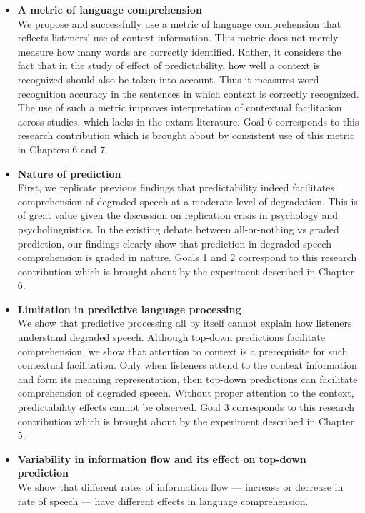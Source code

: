 \documentclass[a4paper, nobind]{templates/ociamthesis}
\begin{document}
\begin{itemize}
\item
  \textbf{A metric of language comprehension}\\
  We propose and successfully use a metric of language comprehension that reflects listeners' use of context information.
  This metric does not merely measure how many words are correctly identified.
  Rather, it considers the fact that in the study of effect of predictability, how well a context is recognized should also be taken into account.
  Thus it measures word recognition accuracy in the sentences in which context is correctly recognized.
  The use of such a metric improves interpretation of contextual facilitation across studies, which lacks in the extant literature.
  Goal 6 corresponds to this research contribution which is brought about by consistent use of this metric in Chapters 6 and 7.
\item
  \textbf{Nature of prediction}\\
  First, we replicate previous findings that predictability indeed facilitates comprehension of degraded speech at a moderate level of degradation.
  This is of great value given the discussion on replication crisis in psychology and psycholinguistics.
  In the existing debate between all-or-nothing vs graded prediction, our findings clearly show that prediction in degraded speech comprehension is graded in nature.
  Goals 1 and 2 correspond to this research contribution which is brought about by the experiment described in Chapter 6.
\item
  \textbf{Limitation in predictive language processing}\\
  We show that predictive processing all by itself cannot explain how listeners understand degraded speech.
  Although top-down predictions facilitate comprehension, we show that attention to context is a prerequisite for such contextual facilitation.
  Only when listeners attend to the context information and form its meaning representation, then top-down predictions can facilitate comprehension of degraded speech.
  Without proper attention to the context, predictability effects cannot be observed.
  Goal 3 corresponds to this research contribution which is brought about by the experiment described in Chapter 5.
\item
  \textbf{Variability in information flow and its effect on top-down prediction}\\
  We show that different rates of information flow --- increase or decrease in rate of speech --- have different effects in language comprehension.

\end{itemize}
\end{document}
